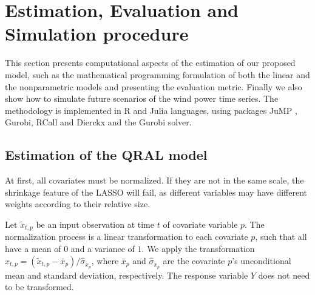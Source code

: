 \section{Estimation, Evaluation and Simulation procedure} \label{sec:estimation-evaluation-simulation}

This section presents computational aspects of the estimation of our proposed model, such as the mathematical programming formulation of both the linear and the nonparametric models and presenting the evaluation metric. 
Finally we also show how to simulate future scenarios of the wind power time series.
The methodology is implemented in R \cite{rlanguage2008} and Julia \cite{bezanson2012julia} languages, using  packages JuMP \cite{DunningHuchetteLubin2017}, Gurobi, RCall and Dierckx and the Gurobi solver. 



\subsection{Estimation of the QRAL model} \label{sec:qral-estimation}

At first, all covariates must be normalized. 
If they are not in the same scale, the shrinkage feature of the LASSO will fail, as different variables may have different weights according to their relative size.

Let $\tilde x_{t,p}$ be an input observation at time $t$ of covariate variable $p$.
The normalization process is a linear transformation to each covariate $p$, such that all have a mean of $0$ and a variance of $1$. 
We apply the transformation ${x}_{t,p} = (\tilde x_{t,p} - \bar{x}_{p}) / \hat\sigma_{\tilde x_{p}}$, where $\bar{x}_{p}$ and $\hat{\sigma}_{\tilde x_{p}}$ are the covariate $p$'s unconditional mean and standard deviation, respectively. The response variable $Y$ does not need to be transformed.


